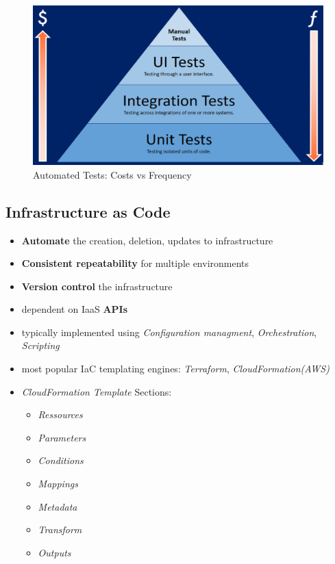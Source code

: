 \documentclass[a4paper]{article}
\begin{document}
\begin{multicols}{3}
\begin{figure}[H]
    \includegraphics[width=\linewidth]{CostvsFreqTesting.png}
    \caption{Automated Tests: Costs vs Frequency}
    \label{fig:autotest}
\end{figure}

\subsection{Infrastructure as Code}
\begin{itemize}
    \item \textbf{Automate} the creation, deletion, updates to infrastructure
    \item \textbf{Consistent repeatability} for multiple environments
    \item \textbf{Version control} the infrastructure
    \item dependent on IaaS \textbf{APIs}
    \item typically implemented using \textit{Configuration managment}, \textit{Orchestration}, \textit{Scripting}
    \item most popular IaC templating engines: \textit{Terraform}, \textit{CloudFormation(AWS)}
    \item \textit{CloudFormation Template} Sections:
        \begin{itemize}
            \item \textit{Ressources}
            \item \textit{Parameters}
            \item \textit{Conditions}
            \item \textit{Mappings}
            \item \textit{Metadata}
            \item \textit{Transform}
            \item \textit{Outputs}
        \end{itemize} 
\end{itemize}




\end{multicols}
\end{document}
